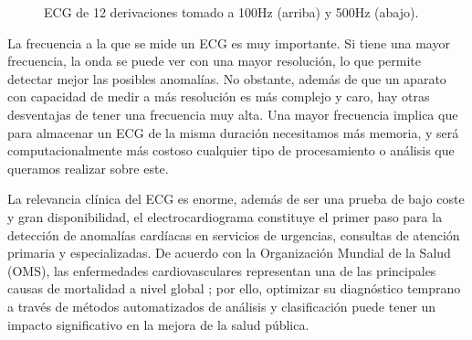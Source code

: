 \begin{figure}[t]
	\setlength{\fboxsep}{0pt}%
	\caption{ECG de 12 derivaciones tomado a 100Hz (arriba) y 500Hz (abajo).}
	\label{fig:ecg}
\end{figure}

La frecuencia a la que se mide un ECG es muy importante. Si tiene una mayor frecuencia, la onda se puede ver con una mayor resolución, lo que permite detectar mejor las posibles anomalías. No obstante, además de que un aparato con capacidad de medir a más resolución es más complejo y caro, hay otras desventajas de tener una frecuencia muy alta. Una mayor frecuencia implica que para almacenar un ECG de la misma duración necesitamos más memoria, y será computacionalmente más costoso cualquier tipo de procesamiento o análisis que queramos realizar sobre este.

La relevancia clínica del ECG es enorme, además de ser una prueba de bajo coste y gran disponibilidad, el electrocardiograma constituye el primer paso para la detección de anomalías cardíacas en servicios de urgencias, consultas de atención primaria y especializadas. De acuerdo con la Organización Mundial de la Salud (OMS), las enfermedades cardiovasculares representan una de las principales causas de mortalidad a nivel global \citep{whocvd}; por ello, optimizar su diagnóstico temprano a través de métodos automatizados de análisis y clasificación puede tener un impacto significativo en la mejora de la salud pública.

